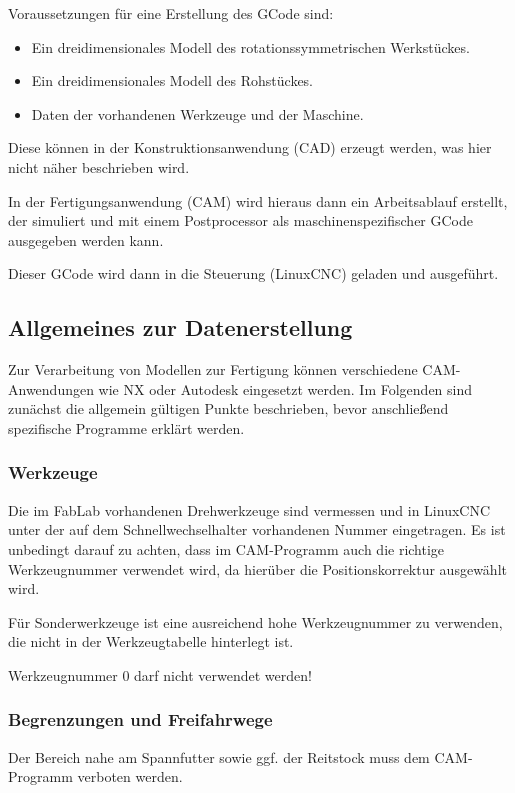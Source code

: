 \documentclass{\basedir/fablab-document}
\begin{document}
Voraussetzungen für eine Erstellung des GCode sind:
\begin{itemize}
	\item Ein dreidimensionales Modell des rotationssymmetrischen Werkstückes.
	\item Ein dreidimensionales Modell des Rohstückes.
	\item Daten der vorhandenen Werkzeuge und der Maschine.
\end{itemize}
Diese können in der Konstruktionsanwendung (CAD) erzeugt werden, was hier nicht näher beschrieben wird.

In der Fertigungsanwendung (CAM) wird hieraus dann ein Arbeitsablauf erstellt, der simuliert und mit einem Postprocessor als maschinenspezifischer GCode ausgegeben werden kann.

Dieser GCode wird dann in die Steuerung (LinuxCNC) geladen und ausgeführt.

\subsection{Allgemeines zur Datenerstellung}

Zur Verarbeitung von Modellen zur Fertigung können verschiedene CAM-Anwendungen wie NX oder Autodesk eingesetzt werden. Im Folgenden sind zunächst die allgemein gültigen Punkte beschrieben, bevor anschließend spezifische Programme erklärt werden.

\subsubsection{Werkzeuge}

Die im FabLab vorhandenen Drehwerkzeuge sind vermessen und in LinuxCNC unter der auf dem Schnellwechselhalter vorhandenen Nummer eingetragen. Es ist unbedingt darauf zu achten, dass im CAM-Programm auch die richtige Werkzeugnummer verwendet wird, da hierüber die Positionskorrektur ausgewählt wird.

Für Sonderwerkzeuge ist eine ausreichend hohe Werkzeugnummer zu verwenden, die nicht in der Werkzeugtabelle hinterlegt ist.

Werkzeugnummer 0 darf nicht verwendet werden!

\subsubsection{Begrenzungen und Freifahrwege}

Der Bereich nahe am Spannfutter sowie ggf. der Reitstock muss dem CAM-Programm verboten werden.
\end{document}
